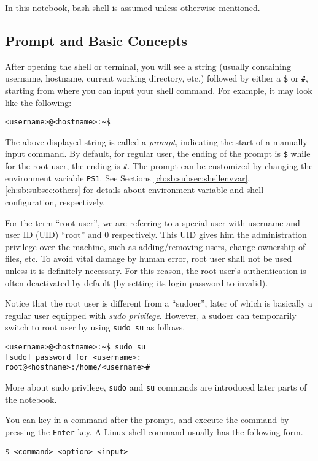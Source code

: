 In this notebook, bash shell is assumed unless otherwise mentioned.

\subsection{Prompt and Basic Concepts}

After opening the shell or terminal, you will see a string (usually containing username, hostname, current working directory, etc.) followed by either a \verb|$| or \verb|#|, starting from where you can input your shell command. For example, it may look like the following:
\begin{lstlisting}
<username>@<hostname>:~$
\end{lstlisting}

The above displayed string is called a \textit{prompt}, indicating the start of a manually input command. By default, for regular user, the ending of the prompt is \verb|$| while for the root user, the ending is \verb|#|. The prompt can be customized by changing the environment variable \verb|PS1|. See Sections \ref{ch:sb:subsec:shellenvvar}, \ref{ch:sb:subsec:others} for details about environment variable and shell configuration, respectively.

For the term ``root user'', we are referring to a special user with username and user ID (UID) ``root'' and 0 respectively. This UID gives him the administration privilege over the machine, such as adding/removing users, change ownership of files, etc. To avoid vital damage by human error, root user shall not be used unless it is definitely necessary. For this reason, the root user's authentication is often deactivated by default (by setting its login password to invalid).

Notice that the root user is different from a ``sudoer'', later of which is basically a regular user equipped with \textit{sudo privilege}. However, a sudoer can temporarily switch to root user by using \verb|sudo su| as follows.
\begin{lstlisting}
<username>@<hostname>:~$ sudo su
[sudo] password for <username>:
root@<hostname>:/home/<username>#
\end{lstlisting}

More about sudo privilege, \verb|sudo| and \verb|su| commands are introduced later parts of the notebook.

You can key in a command after the prompt, and execute the command by pressing the \verb|Enter| key. A Linux shell command usually has the following form.
\begin{lstlisting}
$ <command> <option> <input>
\end{lstlisting}

